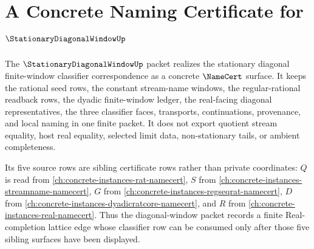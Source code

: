 \chapter{A Concrete Naming Certificate for $\StationaryDiagonalWindowUp$}
\label{ch:concrete-instances-stationarydiagonalwindow-namecert}

The $\StationaryDiagonalWindowUp$ packet realizes the stationary diagonal finite-window classifier correspondence as a concrete $\NameCert$ surface. It keeps the rational seed rows, the constant stream-name windows, the regular-rational readback rows, the dyadic finite-window ledger, the real-facing diagonal representatives, the three classifier faces, transports, continuations, provenance, and local naming in one finite packet. It does not export quotient stream equality, host real equality, selected limit data, non-stationary tails, or ambient completeness.

Its five source rows are sibling certificate rows rather than private coordinates: $Q$ is read from \autoref{ch:concrete-instances-rat-namecert}, $S$ from \autoref{ch:concrete-instances-streamname-namecert}, $G$ from \autoref{ch:concrete-instances-regseqrat-namecert}, $D$ from \autoref{ch:concrete-instances-dyadicratcore-namecert}, and $R$ from \autoref{ch:concrete-instances-real-namecert}. Thus the diagonal-window packet records a finite Real-completion lattice edge whose classifier row can be consumed only after those five sibling surfaces have been displayed.


